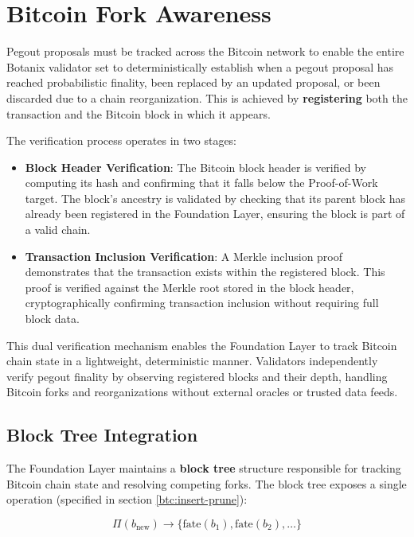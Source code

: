 \section{Bitcoin Fork Awareness}
\label{sec:bitcoin-fork-awareness}

Pegout proposals must be tracked across the Bitcoin network to enable the entire Botanix validator set to deterministically establish when a pegout proposal has reached probabilistic finality, been replaced by an updated proposal, or been discarded due to a chain reorganization. This is achieved by \textbf{registering} both the transaction and the Bitcoin block in which it appears.

The verification process operates in two stages:

\begin{itemize}
    \item \textbf{Block Header Verification}: The Bitcoin block header is verified by computing its hash and confirming that it falls below the Proof-of-Work target. The block's ancestry is validated by checking that its parent block has already been registered in the Foundation Layer, ensuring the block is part of a valid chain.
    \item \textbf{Transaction Inclusion Verification}: A Merkle inclusion proof demonstrates that the transaction exists within the registered block. This proof is verified against the Merkle root stored in the block header, cryptographically confirming transaction inclusion without requiring full block data.
\end{itemize}

This dual verification mechanism enables the Foundation Layer to track Bitcoin chain state in a lightweight, deterministic manner. Validators independently verify pegout finality by observing registered blocks and their depth, handling Bitcoin forks and reorganizations without external oracles or trusted data feeds.

\subsection{Block Tree Integration}

The Foundation Layer maintains a \textbf{block tree} structure responsible for tracking Bitcoin chain state and resolving competing forks. The block tree exposes a single operation (specified in section \ref{btc:insert-prune}):

\begin{equation}
    \Pi(b_{\text{new}}) \rightarrow \{\text{fate}(b_1), \text{fate}(b_2), \ldots\}
\end{equation}

